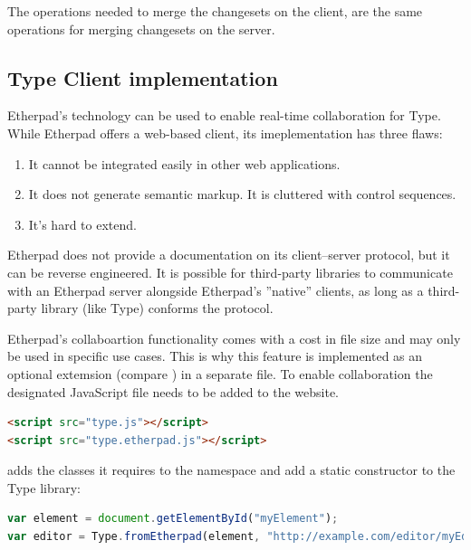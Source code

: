 The operations needed to merge the changesets on the client, are the same operations for merging changesets on the server.

\subsection{Type Client implementation}

Etherpad's technology can be used to enable real-time collaboration for Type. While Etherpad offers a web-based client, its imeplementation has three flaws:

\begin{enumerate}
\item It cannot be integrated easily in other web applications.
\item It does not generate semantic markup. It is cluttered with control sequences.
\item It's hard to extend.
\end{enumerate}

Etherpad does not provide a documentation on its client--server protocol, but it can be reverse engineered. It is possible for third-party libraries to communicate with an Etherpad server alongside Etherpad's ''native'' clients, as long as a third-party library (like Type) conforms the protocol.

Etherpad's collaboartion functionality comes with a cost in file size and may only be used in specific use cases. This is why this feature is implemented as an optional extemsion (compare ) in a separate file. To enable collaboration the designated JavaScript file needs to be added to the website.

\begin{lstlisting}[language=html, caption=Enabling real-time collaboration to Type, label=lst:add_etherpad_html]
<script src="type.js"></script>
<script src="type.etherpad.js"></script>
\end{lstlisting}

 adds the classes it requires to the  namespace and add a static constructor to the Type library:

\begin{lstlisting}[language=JavaScript, caption=Factory method to generate a collaborative Type instance, label=lst:etherpad_constructor]
var element = document.getElementById("myElement");
var editor = Type.fromEtherpad(element, "http://example.com/editor/myEditorId");
\end{lstlisting}

